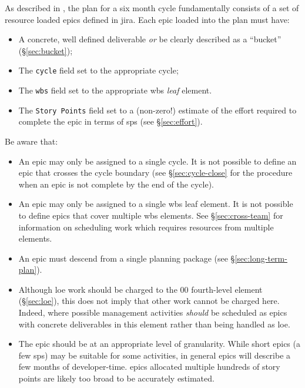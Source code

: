 As described in , the plan for a six month \gls{cycle} fundamentally consists of a set of resource loaded \glspl{epic} defined in \gls{jira}.
Each \gls{epic} loaded into the plan must have:

\begin{itemize}
\item
  A concrete, well defined deliverable \emph{or} be clearly described as a ``bucket'' (\S\ref{sec:bucket});
\item
  The \texttt{cycle} field set to the appropriate \gls{cycle};
\item
  The \texttt{wbs} field set to the appropriate \gls{wbs} \emph{leaf} \gls{element}.
\item
  The \texttt{Story Points} field set to a (non-zero!) estimate of the effort required to complete the \gls{epic} in terms of \glspl{sp} (see \S\ref{sec:effort}).
\end{itemize}

Be aware that:

\begin{itemize}
\item
  An \gls{epic} may only be assigned to a single \gls{cycle}.
  It is not possible to define an \gls{epic} that crosses the \gls{cycle} boundary (see \S\ref{sec:cycle-close} for the procedure when an \gls{epic} is not complete by the end of the \gls{cycle}).
\item
  An \gls{epic} may only be assigned to a single \gls{wbs} leaf \gls{element}.
  It is not possible to define \glspl{epic} that cover multiple \gls{wbs} \glspl{element}.
  See \S\ref{sec:cross-team} for information on scheduling work which requires resources from multiple \glspl{element}.
\item
  An \gls{epic} must descend from a single planning package (see \S\ref{sec:long-term-plan}).
\item
  Although \gls{loe} work should be charged to the 00 fourth-level \gls{element} (\S\ref{sec:loe}), this does not imply that other work cannot be charged here.
  Indeed, where possible management activities \emph{should} be scheduled as \glspl{epic} with concrete deliverables in this \gls{element} rather than being handled as \gls{loe}.
\item
  The \gls{epic} should be at an appropriate level of granularity.
  While short \glspl{epic} (a few \glspl{sp}) may be suitable for some activities, in general \glspl{epic} will describe a few months of developer-time.
  \Glspl{epic} allocated multiple hundreds of \gls{story} points are likely too broad to be accurately estimated.
\end{itemize}


